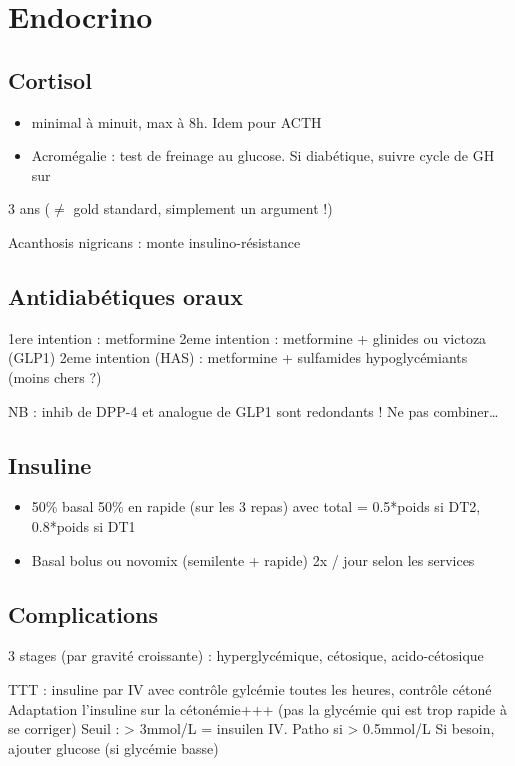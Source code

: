 \documentclass[11pt]{article}
\date{\today}
\title{}
\begin{document}
\tableofcontents

\section{Endocrino}
\label{sec:org43cb61a}
\subsection{Cortisol}
\label{sec:org6dda5f0}
\begin{itemize}
\item minimal à minuit, max à 8h. Idem pour ACTH
\item Acromégalie : test de freinage au glucose. Si diabétique, suivre cycle de GH sur
\end{itemize}
3 ans (\(\ne\) gold standard, simplement un argument !)

Acanthosis nigricans : monte insulino-résistance
\subsection{Antidiabétiques oraux}
\label{sec:orgdb6d20e}
1ere intention : metformine
2eme intention : metformine + glinides ou victoza (GLP1) 
2eme intention (HAS) : metformine + sulfamides hypoglycémiants (moins chers ?)

NB : inhib de DPP-4 et analogue de GLP1 sont redondants ! Ne pas combiner\ldots{}

\subsection{Insuline}
\label{sec:orgecfe3a2}
\begin{itemize}
\item 50\% basal 50\% en rapide (sur les 3 repas) avec total = 0.5*poids si DT2, 0.8*poids si DT1
\item Basal bolus ou novomix (semilente + rapide) 2x / jour selon les services
\end{itemize}
\subsection{Complications}
\label{sec:org2c9372c}
3 stages (par gravité croissante) : hyperglycémique, cétosique, acido-cétosique

TTT : insuline par IV avec contrôle gylcémie toutes les heures, contrôle cétoné
Adaptation l'insuline sur la cétonémie+++ (pas la glycémie qui est trop rapide à se corriger)
Seuil : > 3mmol/L = insuilen IV. Patho si > 0.5mmol/L
Si besoin, ajouter glucose (si glycémie basse)
\end{document}

